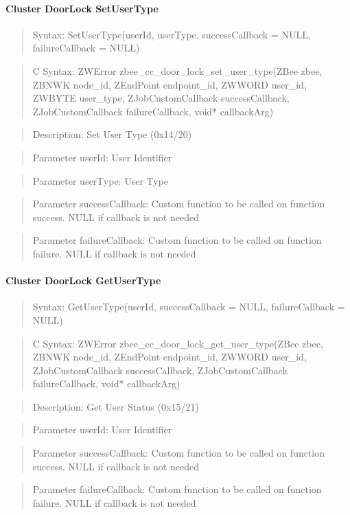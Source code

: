 \paragraph{Cluster DoorLock SetUserType}
\begin{quote}Syntax: SetUserType(userId, userType, successCallback = NULL, failureCallback = NULL)\end{quote}
\begin{quote}C Syntax: ZWError zbee\_cc\_door\_lock\_set\_user\_type(ZBee zbee, ZBNWK node\_id, ZEndPoint endpoint\_id, ZWWORD user\_id, ZWBYTE user\_type, ZJobCustomCallback successCallback, ZJobCustomCallback failureCallback, void* callbackArg)\end{quote}
\begin{quote}Description: Set User Type (0x14/20)\end{quote}
\begin{quote}Parameter userId: User Identifier\end{quote}
\begin{quote}Parameter userType: User Type\end{quote}
\begin{quote}Parameter successCallback: Custom function to be called on function success. NULL if callback is not needed\end{quote}
\begin{quote}Parameter failureCallback: Custom function to be called on function failure. NULL if callback is not needed\end{quote}


\paragraph{Cluster DoorLock GetUserType}
\begin{quote}Syntax: GetUserType(userId, successCallback = NULL, failureCallback = NULL)\end{quote}
\begin{quote}C Syntax: ZWError zbee\_cc\_door\_lock\_get\_user\_type(ZBee zbee, ZBNWK node\_id, ZEndPoint endpoint\_id, ZWWORD user\_id, ZJobCustomCallback successCallback, ZJobCustomCallback failureCallback, void* callbackArg)\end{quote}
\begin{quote}Description: Get User Status (0x15/21)\end{quote}
\begin{quote}Parameter userId: User Identifier\end{quote}
\begin{quote}Parameter successCallback: Custom function to be called on function success. NULL if callback is not needed\end{quote}
\begin{quote}Parameter failureCallback: Custom function to be called on function failure. NULL if callback is not needed\end{quote}


